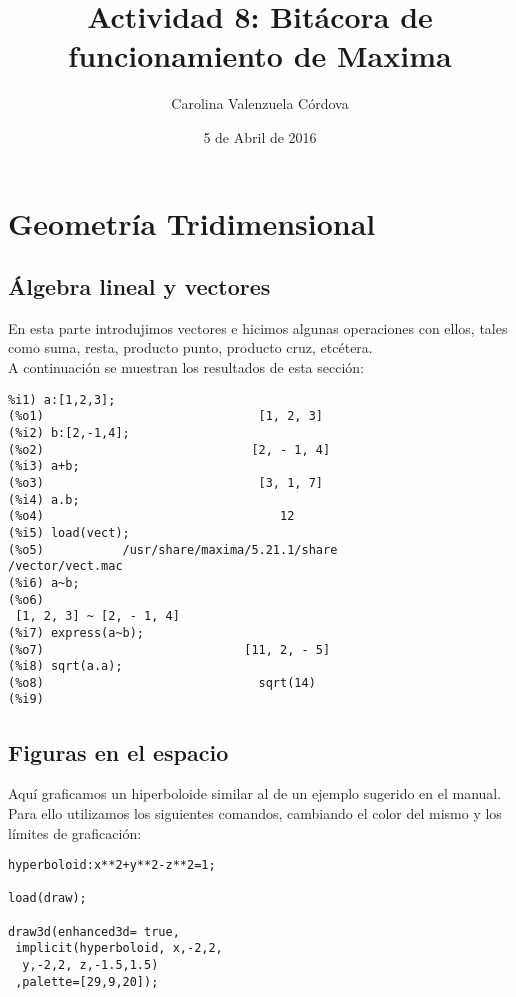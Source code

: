 \documentclass[12 pt,twocolumn]{article}
\begin{document}
\title{Actividad 8: Bitácora de funcionamiento de Maxima}
\author{Carolina Valenzuela Córdova}
\date{5 de Abril de 2016}
\maketitle
\pagebreak

\maketitle

\newpage
{}
\tableofcontents
\pagebreak

\section{Geometría Tridimensional}
\subsection{Álgebra lineal y vectores}
En esta parte introdujimos vectores e hicimos algunas operaciones con ellos, tales como suma, resta, producto punto, producto cruz, etcétera.\\ A continuación se muestran los resultados de esta sección:

\begin{verbatim}
%i1) a:[1,2,3];
(%o1)                              [1, 2, 3]
(%i2) b:[2,-1,4];
(%o2)                             [2, - 1, 4]
(%i3) a+b;
(%o3)                              [3, 1, 7]
(%i4) a.b;
(%o4)                                 12
(%i5) load(vect);
(%o5)           /usr/share/maxima/5.21.1/share
/vector/vect.mac
(%i6) a~b;
(%o6)                      
 [1, 2, 3] ~ [2, - 1, 4]
(%i7) express(a~b);
(%o7)                            [11, 2, - 5]
(%i8) sqrt(a.a);
(%o8)                              sqrt(14)
(%i9) 
\end{verbatim}	

\subsection{Figuras en el espacio}
Aquí graficamos un hiperboloide similar al de un ejemplo sugerido en el manual. Para ello utilizamos los siguientes comandos, cambiando el color del mismo y los límites de graficación:
\begin{verbatim}
hyperboloid:x**2+y**2-z**2=1;

load(draw);

draw3d(enhanced3d= true,
 implicit(hyperboloid, x,-2,2,
  y,-2,2, z,-1.5,1.5)
 ,palette=[29,9,20]);
\end{verbatim}
\end{document}
